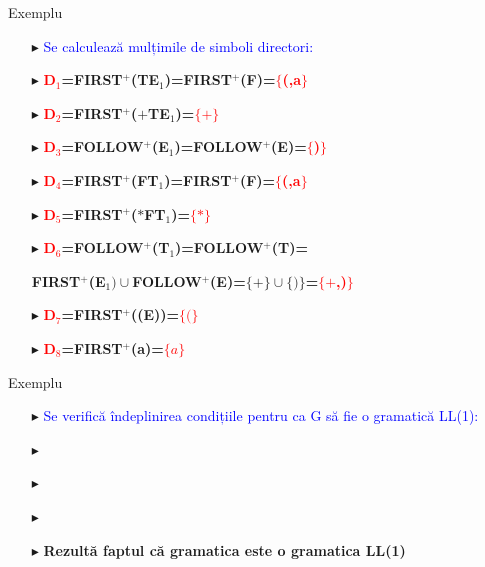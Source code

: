 \documentclass[pdf]{beamer}
\newcommand{\tab}[1]{\hspace{.2\textwidth}\rlap{#1}}
\begin{document}
\begin{frame}{Exemplu}
\begin{itemize}
\item[$\blacktriangleright$]
\textcolor{blue}{Se calculează mulțimile de simboli directori:}
\item[$\blacktriangleright$]
\textbf{\textcolor{red}{D$_1$}=FIRST$^+$(TE$_1$)=FIRST$^+$(F)=\textcolor{red}{$\lbrace$(,a$\rbrace$}}
\item[$\blacktriangleright$]
\textbf{\textcolor{red}{D$_2$}=FIRST$^+$($+$TE$_1$)=\textcolor{red}{$\lbrace+\rbrace$}}
\item[$\blacktriangleright$]
\textbf{\textcolor{red}{D$_3$}=FOLLOW$^+$(E$_1$)=FOLLOW$^+$(E)=\textcolor{red}{$\lbrace$)$\rbrace$}}
\item[$\blacktriangleright$]
\textbf{\textcolor{red}{D$_4$}=FIRST$^+$(FT$_1$)=FIRST$^+$(F)=\textcolor{red}{$\lbrace$(,a$\rbrace$}}
\item[$\blacktriangleright$]
\textbf{\textcolor{red}{D$_5$}=FIRST$^+$($*$FT$_1$)=\textcolor{red}{$\lbrace*\rbrace$}}
\item[$\blacktriangleright$]
\textbf{\textcolor{red}{D$_6$}=FOLLOW$^+$(T$_1$)=FOLLOW$^+$(T)=}

\textbf{FIRST$^+$(E$_1) \cup$FOLLOW$^+$(E)=$\lbrace+\rbrace \cup \lbrace)\rbrace$=\textcolor{red}{$\lbrace+$,)$\rbrace$}}
\item[$\blacktriangleright$]
\textbf{\textcolor{red}{D$_7$}=FIRST$^+$((E))=\textcolor{red}{$\lbrace(\rbrace$}}
\item[$\blacktriangleright$]
\textbf{\textcolor{red}{D$_8$}=FIRST$^+$(a)=\textcolor{red}{$\lbrace a\rbrace$}}
\end{itemize}
\end{frame}



\begin{frame}{Exemplu}
\begin{itemize}
\item[$\blacktriangleright$]
\textcolor{blue}{Se verifică îndeplinirea condițiile pentru ca G să fie o gramatică LL(1): }
\item[$\blacktriangleright$]
\tab \textbf{D$_2 \cap$D$_3$ = $\emptyset$}
\item[$\blacktriangleright$]
\tab \textbf{D$_5 \cap$D$_6$ = $\emptyset$}
\item[$\blacktriangleright$]
\tab \textbf{D$_7 \cap$D$_8$ = $\emptyset$}
\item[$\blacktriangleright$]
\textbf{Rezultă faptul că gramatica este o gramatica \textbf{LL(1)}}
\end{itemize}
\end{frame}
\end{document}
